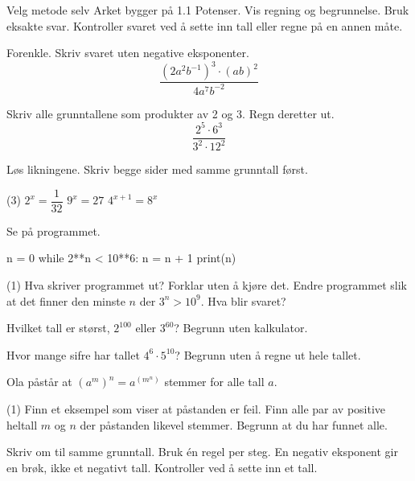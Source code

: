 
\begin{infoboks}{Velg metode selv}
Arket bygger på 1.1 Potenser. Vis regning og begrunnelse. Bruk eksakte svar.
Kontroller svaret ved å sette inn tall eller regne på en annen måte.
\end{infoboks}


Forenkle. Skriv svaret uten negative eksponenter.
\[ \frac{(2a^2b^{-1})^3 \cdot (ab)^2}{4a^7b^{-2}} \]

Skriv alle grunntallene som produkter av 2 og 3. Regn deretter ut.
\[ \frac{2^5 \cdot 6^3}{3^2 \cdot 12^2} \]

Løs likningene. Skriv begge sider med samme grunntall først.
\begin{tasks}(3)
  \task $2^x = \dfrac{1}{32}$
  \task $9^x = 27$
  \task $4^{x+1} = 8^x$
\end{tasks}

Se på programmet.
\begin{kode}
n = 0
while 2**n < 10**6:
    n = n + 1
print(n)
\end{kode}
\begin{tasks}(1)
  \task Hva skriver programmet ut? Forklar uten å kjøre det.
  \task Endre programmet slik at det finner den minste $n$ der $3^n > 10^9$. Hva blir svaret?
\end{tasks}


Hvilket tall er størst, $2^{100}$ eller $3^{60}$? Begrunn uten kalkulator.

Hvor mange sifre har tallet $4^6 \cdot 5^{10}$? Begrunn uten å regne ut hele tallet.

Ola påstår at $(a^m)^n = a^{(m^n)}$ stemmer for alle tall $a$.
\begin{tasks}(1)
  \task Finn et eksempel som viser at påstanden er feil.
  \task Finn alle par av positive heltall $m$ og $n$ der påstanden likevel stemmer. Begrunn at du har funnet alle.
\end{tasks}

\begin{oppsummering}
Skriv om til samme grunntall. Bruk én regel per steg.
En negativ eksponent gir en brøk, ikke et negativt tall.
Kontroller ved å sette inn et tall.
\end{oppsummering}

